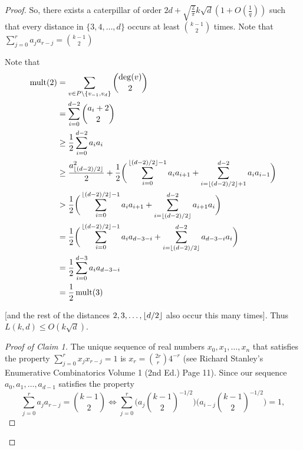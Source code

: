 \documentclass[12]{article}
\DeclarePairedDelimiter\ceil{\lceil}{\rceil}
\DeclarePairedDelimiter\floor{\lfloor}{\rfloor}
\DeclareMathOperator{\mult}{mult}
\theoremstyle{definition}
\begin{document}
\begin{proof}
		
		
		
		So, there exists a caterpillar of order $2d + \sqrt{\frac{2}{\pi}}k\sqrt{d}  (1+O(\tfrac{1}{q}))$ such that every distance in $\{3, 4, \ldots, d\}$ occurs at least ${k-1 \choose 2}$ times.  Note that
		$\sum_{j=0}^{r}a_ja_{r-j} = {k-1 \choose 2}$
		
		
		
		Note that 
		\begin{align*}
			\mult(2) &= \sum_{v \in P\setminus \{v_{-1},v_d\}} {\deg(v) \choose 2}	\\
			&= \sum_{i=0}^{d-2}{a_i+2 \choose 2} 	\\
			&\geq \frac{1}{2}\sum_{i=0}^{d-2}a_ia_i	\\
			&\geq \frac{a_{\floor{(d-2)/2}}^2}{2} + \frac{1}{2}\biggr(\sum_{i=0}^{\floor{(d-2)/2}-1}a_ia_{i+1} + \sum_{i=\floor{(d-2)/2}+1}^{d-2}a_{i}a_{i-1} \biggr)	\\
			&> \frac{1}{2}\biggr(\sum_{i=0}^{\floor{(d-2)/2}-1}a_ia_{i+1} + \sum_{i=\floor{(d-2)/2}}^{d-2}a_{i+1}a_{i} \biggr)	\\
			&= \frac{1}{2}\biggr(\sum_{i=0}^{\floor{(d-2)/2}-1}a_ia_{d-3-i} + \sum_{i=\floor{(d-2)/2}}^{d-2}a_{d-3-i}a_{i} \biggr)	\\
			&= \frac{1}{2}\sum_{i=0}^{d-3}a_ia_{d-3-i}	\\
			&= \frac{1}{2}\mult(3)
		\end{align*}
		
		
		[and the rest of the distances $2, 3, \ldots, \floor{d/2}$ also occur this many times].  Thus $L(k,d) \leq O(k\sqrt{d})$.
		
		\begin{proof}[Proof of Claim 1]
			
			The unique sequence of real numbers $x_0, x_1, \ldots, x_n$ that satisfies the property $\sum_{j=0}^r x_jx_{r-j} = 1$ is $x_r = {2r \choose r}4^{-r}$ (see Richard Stanley's Enumerative Combinatorics Volume 1 (2nd Ed.) Page 11).  Since our sequence $a_0, a_1, \ldots, a_{d-1}$ satisfies the property
			$$\sum_{j=0}^{r}a_j a_{r-j} = {k-1 \choose 2} \Leftrightarrow
			\sum_{j=0}^{r}\biggr( a_j {k-1 \choose 2}^{-1/2} \biggr) \biggr( a_{i-j}{k-1 \choose 2}^{-1/2} \biggr) = 1,$$
			

\end{proof}
\end{proof}
\end{document}
